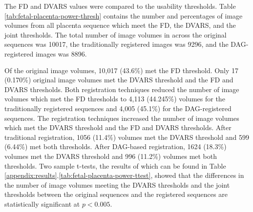 The FD and DVARS values were compared to the usability thresholds. Table \ref{tab:fetal-placenta-power-thresh} contains the number and percentages of image volumes from all placenta sequence which meet the FD, the DVARS, and the joint thresholds. The total number of image volumes in across the original sequences was 10017, the traditionally registered images was 9296, and the DAG-registered images was 8896. 

Of the original image volumes, 10,017 (43.6\%) met the FD threshold. Only 17 (0.170\%) original image volumes met the DVARS threshold and the FD and DVARS thresholds. Both registration techniques reduced the number of image volumes which met the FD thresholds to 4,113 (44.245\%) volumes for the traditionally registered sequences and 4,005 (45.1\%) for the DAG-registered sequences. The registration techniques increased the number of image volumes which met the DVARS threshold and the FD and DVARS thresholds. After traditional registration, 1056 (11.4\%) volumes met the DVARS threshold and 599 (6.44\%) met both thresholds. After DAG-based registration, 1624 (18.3\%) volumes met the DVARS threshold and 996 (11.2\%) volumes met both thresholds. Two sample t-tests, the results of which can be found in Table \ref{appendix:results}.\ref{tab:fetal-placenta-power-ttest}, showed that the differences in the number of image volumes meeting the DVARS thresholds and the joint thresholds between the original sequences and the registered sequences are statistically significant at $p < 0.005$.

